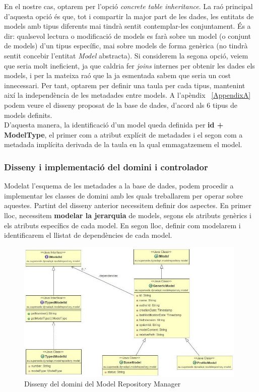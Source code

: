 En el nostre cas, optarem per l'opció \textit{concrete table inheritance}. La raó principal d'aquesta opció és que, tot i compartir la major part de les dades, les entitats de models amb tipus diferents mai tindrà sentit contemplar-les conjuntament. És a dir: qualsevol lectura o modificació de models es farà sobre un model (o conjunt de models) d'un tipus específic, mai sobre models de forma genèrica (no tindrà sentit concebir l'entitat \textit{Model} abstracta). Si considerem la segona opció, veiem que seria molt ineficient, ja que caldria fer \textit{joins} internes per obtenir les dades els models, i per la mateixa raó que la ja esmentada sabem que seria un cost innecessari. Per tant, optarem per definir una taula per cada tipus, mantenint així la independència de les metadades entre models. A l'apèndix ~\ref{AppendixA} podem veure el disseny proposat de la base de dades, d'acord als 6 tipus de models definits.\\

D'aquesta manera, la identificació d'un model queda definida per \textbf{id + ModelType}, el primer com a atribut explícit de metadades i el segon com a metadada implícita derivada de la taula en la qual emmagatzemem el model.

\subsubsection{Disseny i implementació del domini i controlador}

Modelat l'esquema de les metadades a la base de dades, podem procedir a implementar les classes de domini amb les quals treballarem per operar sobre aquestes. Partint del disseny anterior necessitem definir dos aspectes. En primer lloc, necessitem \textbf{modelar la jerarquia} de models, segons els atributs genèrics i els atributs específics de cada model. En segon lloc, definir com modelarem i identificarem el llistat de dependències de cada model.\\

\begin{figure}
\centering
\includegraphics[width=11cm]{Figures/Figure21}
\decoRule
\caption{Disseny del domini del Model Repository Manager}
\label{fig:Figura21}
\end{figure}

